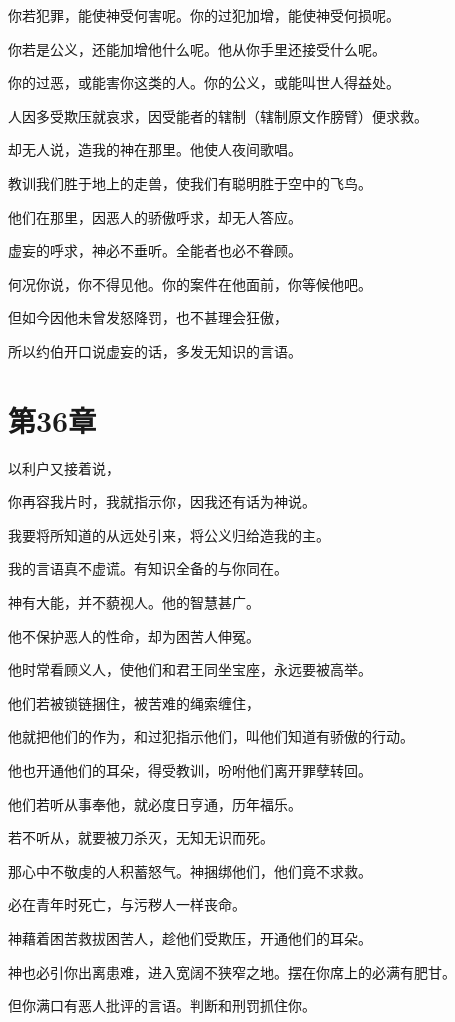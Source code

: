 \documentclass[12pt,oneside]{book}
\begin{document}
你若犯罪，能使神受何害呢。你的过犯加增，能使神受何损呢。

你若是公义，还能加增他什么呢。他从你手里还接受什么呢。

你的过恶，或能害你这类的人。你的公义，或能叫世人得益处。

人因多受欺压就哀求，因受能者的辖制（辖制原文作膀臂）便求救。

却无人说，造我的神在那里。他使人夜间歌唱。

教训我们胜于地上的走兽，使我们有聪明胜于空中的飞鸟。

他们在那里，因恶人的骄傲呼求，却无人答应。

虚妄的呼求，神必不垂听。全能者也必不眷顾。

何况你说，你不得见他。你的案件在他面前，你等候他吧。

但如今因他未曾发怒降罚，也不甚理会狂傲，

所以约伯开口说虚妄的话，多发无知识的言语。


\chapter{第36章}
以利户又接着说，

你再容我片时，我就指示你，因我还有话为神说。

我要将所知道的从远处引来，将公义归给造我的主。

我的言语真不虚谎。有知识全备的与你同在。

神有大能，并不藐视人。他的智慧甚广。

他不保护恶人的性命，却为困苦人伸冤。

他时常看顾义人，使他们和君王同坐宝座，永远要被高举。

他们若被锁链捆住，被苦难的绳索缠住，

他就把他们的作为，和过犯指示他们，叫他们知道有骄傲的行动。

他也开通他们的耳朵，得受教训，吩咐他们离开罪孽转回。

他们若听从事奉他，就必度日亨通，历年福乐。

若不听从，就要被刀杀灭，无知无识而死。

那心中不敬虔的人积蓄怒气。神捆绑他们，他们竟不求救。

必在青年时死亡，与污秽人一样丧命。

神藉着困苦救拔困苦人，趁他们受欺压，开通他们的耳朵。

神也必引你出离患难，进入宽阔不狭窄之地。摆在你席上的必满有肥甘。

但你满口有恶人批评的言语。判断和刑罚抓住你。
\end{document}
